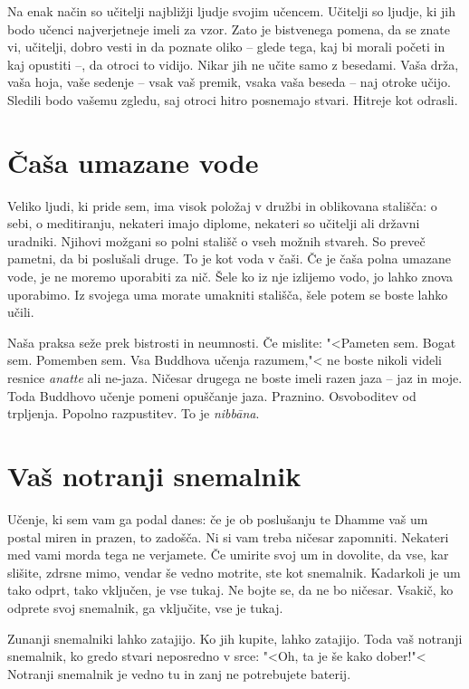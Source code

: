 Na enak način so učitelji najbližji ljudje svojim učencem. Učitelji so ljudje, ki jih bodo učenci najverjetneje imeli za vzor. Zato je bistvenega pomena, da se znate vi, učitelji, dobro vesti in da poznate oliko – glede tega, kaj bi morali početi in kaj opustiti –, da otroci to vidijo. Nikar jih ne učite samo z besedami. Vaša drža, vaša hoja, vaše sedenje – vsak vaš premik, vsaka vaša beseda – naj otroke učijo. Sledili bodo vašemu zgledu, saj otroci hitro posnemajo stvari. Hitreje kot odrasli.

\section{Čaša umazane vode}

Veliko ljudi, ki pride sem, ima visok položaj v družbi in oblikovana stališča: o sebi, o meditiranju, nekateri imajo diplome, nekateri so učitelji ali državni uradniki. Njihovi možgani so polni stališč o vseh možnih stvareh. So preveč pametni, da bi poslušali druge. To je kot voda v čaši. Če je čaša polna umazane vode, je ne moremo uporabiti za nič. Šele ko iz nje izlijemo vodo, jo lahko znova uporabimo. Iz svojega uma morate umakniti stališča, šele potem se boste lahko učili.

Naša praksa seže prek bistrosti in neumnosti. Če mislite: "<Pameten sem. Bogat sem. Pomemben sem. Vsa Buddhova učenja razumem,"< ne boste nikoli videli resnice \emph{anatte} ali ne-jaza. Ničesar drugega ne boste imeli razen jaza – jaz in moje. Toda Buddhovo učenje pomeni opuščanje jaza. Praznino. Osvoboditev od trpljenja. Popolno razpustitev. To je \emph{nibbāna}.

\section{Vaš notranji snemalnik}

Učenje, ki sem vam ga podal danes: če je ob poslušanju te Dhamme vaš um postal miren in prazen, to zadošča. Ni si vam treba ničesar zapomniti. Nekateri med vami morda tega ne verjamete. Če umirite svoj um in dovolite, da vse, kar slišite, zdrsne mimo, vendar še vedno motrite, ste kot snemalnik. Kadarkoli je um tako odprt, tako vključen, je vse tukaj. Ne bojte se, da ne bo ničesar. Vsakič, ko odprete svoj snemalnik, ga vključite, vse je tukaj.

Zunanji snemalniki lahko zatajijo. Ko jih kupite, lahko zatajijo. Toda vaš notranji snemalnik, ko gredo stvari neposredno v srce: "<Oh, ta je še kako dober!"< Notranji snemalnik je vedno tu in zanj ne potrebujete baterij.


